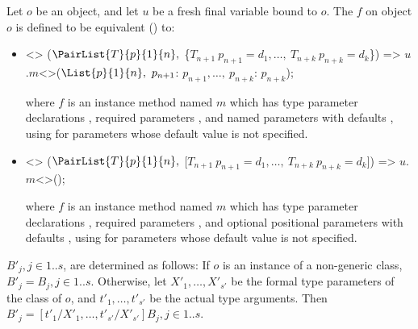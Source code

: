 \documentclass[makeidx]{article}
\begin{document}
{\LMHash{}%
Let $o$ be an object, and let $u$ be a fresh final variable bound to $o$.
The  $f$ on object $o$
is defined to be equivalent
() to:
\begin{itemize}
\item
\begin{normativeDartCode}
<>
($\PairList{T}{p}{1}{n},\ $\{$T_{n+1}\ p_{n+1} = d_1, \ldots,\ T_{n+k}\ p_{n+k} = d_k$\}) =>
\quad$u$.$m$<>($\List{p}{1}{n},\ p_{n+1}$: $p_{n+1}, \ldots,\ p_{n+k}$: $p_{n+k}$);
\end{normativeDartCode}
where $f$ is an instance method named $m$
which has type parameter declarations
\TypeParametersStd,
required parameters ,
and named parameters  with defaults ,
using  for parameters whose default value is not specified.
\item
\begin{normativeDartCode}
<>
($\PairList{T}{p}{1}{n},\ $[$T_{n+1}\ p_{n+1} = d_1, \ldots,\ T_{n+k}\ p_{n+k} = d_k$]) =>
\quad$u$.$m$<>();
\end{normativeDartCode}
where $f$ is an instance method named $m$
which has type parameter declarations
\TypeParametersStd,
required parameters ,
and optional positional parameters
 with defaults ,
using  for parameters whose default value is not specified.
\end{itemize}

\LMHash{}%
$B'_j, j \in 1 .. s$, are determined as follows:
If $o$ is an instance of a non-generic class, $B'_j = B_j, j \in 1 .. s$.
Otherwise, let $X'_1, \ldots, X'_{s'}$ be
the formal type parameters of the class of $o$,
and $t'_1, \ldots, t'_{s'}$ be the actual type arguments.
Then $B'_j = [t'_1/X'_1, \ldots, t'_{s'}/X'_{s'}]B_j, j \in 1 .. s$.

}
\end{document}
